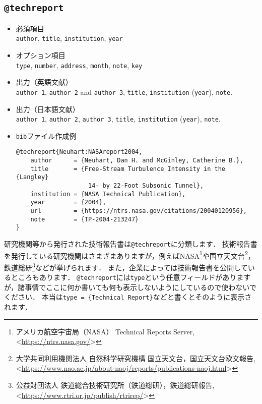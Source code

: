 \documentclass[a4paper,fleqn,uplatex,dvipdfmx]{jsarticle}
\begin{document}
\subsection{\texttt{@techreport}}
\label{ssec:techreport}
\begin{screen}
    \begin{itemize}
        \item 必須項目 \\
        \verb|author|, \verb|title|, \verb|institution|, \verb|year|
        \item オプション項目 \\
        \verb|type|, \verb|number|, \verb|address|, \verb|month|, \verb|note|, \verb|key|
        \item 出力（英語文献） \\
            \colorbox[gray]{0.8}{\texttt{author 1}}, \colorbox[gray]{0.8}{\texttt{author 2}} and \colorbox[gray]{0.8}{\texttt{author 3}}, \colorbox[gray]{0.8}{\texttt{title}}, \colorbox[gray]{0.8}{\texttt{institution}} (\colorbox[gray]{0.8}{\texttt{year}}), \colorbox[gray]{0.8}{\texttt{note}}.
        \item 出力（日本語文献） \\
            \colorbox[gray]{0.8}{\texttt{author 1}}, \colorbox[gray]{0.8}{\texttt{author 2}}, \colorbox[gray]{0.8}{\texttt{author 3}}, \colorbox[gray]{0.8}{\texttt{title}}, \colorbox[gray]{0.8}{\texttt{institution}} (\colorbox[gray]{0.8}{\texttt{year}}), \colorbox[gray]{0.8}{\texttt{note}}.
        \item \verb|bib|ファイル作成例 \vspace{-3mm}
\begin{verbatim}
@techreport{Neuhart:NASAreport2004,
    author      = {Neuhart, Dan H. and McGinley, Catherine B.},
    title       = {Free-Stream Turbulence Intensity in the {Langley} 
                    14- by 22-Foot Subsonic Tunnel},
    institution = {NASA Technical Publication},
    year        = {2004},
    url         = {https://ntrs.nasa.gov/citations/20040120956},
    note        = {TP-2004-213247}
}
\end{verbatim}
    \end{itemize}
\end{screen}

研究機関等から発行された技術報告書は\verb|@techreport|に分類します．
技術報告書を発行している研究機関はさまざまありますが，例えばNASA\footnote{アメリカ航空宇宙局（NASA） Technical Reports Server, \textless\url{https://ntrs.nasa.gov/}\textgreater}や国立天文台\footnote{大学共同利用機関法人 自然科学研究機構 国立天文台，国立天文台欧文報告, \textless\url{https://www.nao.ac.jp/about-naoj/reports/publications-naoj.html}\textgreater}，鉄道総研\footnote{公益財団法人 鉄道総合技術研究所（鉄道総研），鉄道総研報告, \textless\url{https://www.rtri.or.jp/publish/rtrirep/}\textgreater}などが挙げられます．
また，企業によっては技術報告書を公開しているところもあります．
\verb|@techreport|には\verb|type|という任意フィールドがありますが，諸事情でここに何か書いても何も表示しないようにしているので使わないでください．
本当は\verb|type = {Technical Report}|などと書くとそのように表示されます．
\end{document}
